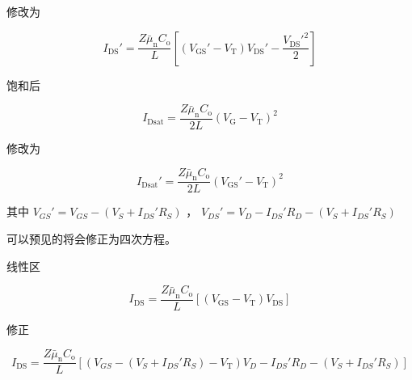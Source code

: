 \documentclass[lang=cn,11pt,a4paper,cite=authoryear]{elegantpaper}
\begin{document}
修改为

\[I_{\mathrm{DS}}'=\frac{Z \bar{\mu}_{\mathrm{n}} C_{\mathrm{o}}}{L}\left[\left(V_{\mathrm{GS}}'-V_{\mathrm{T}}\right) V_{\mathrm{DS}}'-\frac{V_{\mathrm{DS}}'^{2}}{2}\right]\]


饱和后

\[I_{\mathrm{Dsat}}=\frac{Z \bar{\mu}_{\mathrm{n}} C_{\mathrm{o}}}{2 L}\left(V_{\mathrm{G}}-V_{\mathrm{T}}\right)^{2}\]

修改为

\[I_{\mathrm{Dsat}}'=\frac{Z \bar{\mu}_{\mathrm{n}} C_{\mathrm{o}}}{2 L}\left(V_{\mathrm{GS}}'-V_{\mathrm{T}}\right)^{2}\]

其中 \(V_{GS}' = V_{GS} - (V_S + I_{DS}' R_S)\) ， \(V_{DS}' = V_D - I_{DS}' R_D  - (V_S + I_{DS}' R_S)\)

可以预见的将会修正为四次方程。


线性区


\[I_{\mathrm{DS}}=\frac{Z \bar{\mu}_{\mathrm{n}} C_{\mathrm{o}}}{L}\left[\left(V_{\mathrm{GS}}-V_{\mathrm{T}}\right) V_{\mathrm{DS}}\right]\]

修正 

\[I_{\mathrm{DS}}=\frac{Z \bar{\mu}_{\mathrm{n}} C_{\mathrm{o}}}{L}\left[\left(V_{GS} - (V_S + I_{DS}' R_S)-V_{\mathrm{T}}\right)  V_D - I_{DS}' R_D  - (V_S + I_{DS}' R_S)\right]\]






\end{document}
